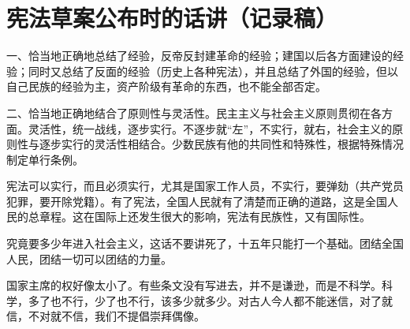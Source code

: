 \section[宪法草案公布时的话讲（记录稿）（一九五四年六月）]{宪法草案公布时的话讲（记录稿）}


一、恰当地正确地总结了经验，反帝反封建革命的经验；建国以后各方面建设的经验；同时又总结了反面的经验（历史上各种宪法），并且总结了外国的经验，但以自己民族的经验为主，资产阶级有革命的东西，也不能全部否定。

二、恰当地正确地结合了原则性与灵活性。民主主义与社会主义原则贯彻在各方面。灵活性，统一战线，逐步实行。不逐步就“左”，不实行，就右，社会主义的原则性与逐步实行的灵活性相结合。少数民族有他的共同性和特殊性，根据特殊情况制定单行条例。

宪法可以实行，而且必须实行，尤其是国家工作人员，不实行，要弹劾（共产党员犯罪，要开除党籍）。有了宪法，全国人民就有了清楚而正确的道路，这是全国人民的总章程。这在国际上还发生很大的影响，宪法有民族性，又有国际性。

究竟要多少年进入社会主义，这话不要讲死了，十五年只能打一个基础。团结全国人民，团结一切可以团结的力量。

国家主席的权好像太小了。有些条文没有写进去，并不是谦逊，而是不科学。科学，多了也不行，少了也不行，该多少就多少。对古人今人都不能迷信，对了就信，不对就不信，我们不提倡崇拜偶像。


